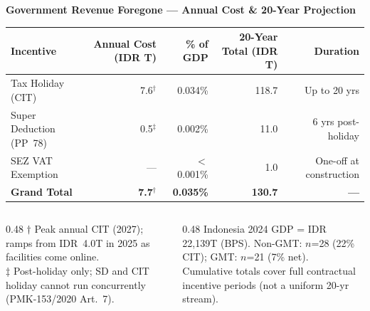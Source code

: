 \documentclass[aspectratio=169,10pt]{beamer}
\begin{document}
\begin{frame}{\textbf{Government Revenue Foregone — Annual Cost \& 20-Year Projection}}
\vspace{0.25cm}
\centering

{\small
\begin{tabular}{lrrrr}
\toprule
\rowcolor{navyblue}
\color{white}\textbf{Incentive} &
\color{white}\textbf{Annual Cost (IDR T)} &
\color{white}\textbf{\% of GDP} &
\color{white}\textbf{20-Year Total (IDR T)} &
\color{white}\textbf{Duration} \\
\midrule
\rowcolor{lightgray}
Tax Holiday (CIT)          & 7.6$^{\dagger}$ & 0.034\% & 118.7 & Up to 20 yrs \\
Super Deduction (PP~78)    & 0.5$^{\ddagger}$ & 0.002\% &  11.0 & 6 yrs post-holiday \\
\rowcolor{lightgray}
SEZ VAT Exemption          & --- & $<$0.001\% &   1.0 & One-off at construction \\
\midrule
\rowcolor{navyblue}
\color{white}\textbf{Grand Total} &
\color{white}\textbf{7.7$^{\dagger}$} &
\color{white}\textbf{0.035\%} &
\color{white}\textbf{130.7} &
\color{white}\textbf{---} \\
\bottomrule
\end{tabular}
}

\vspace{0.4cm}
\begin{columns}[T]
  \begin{column}{0.48\textwidth}
    {\scriptsize
      $\dagger$ Peak annual CIT (2027); ramps from IDR~4.0T in 2025 as facilities come online.\\
      $\ddagger$ Post-holiday only; SD and CIT holiday cannot run concurrently (PMK-153/2020 Art.~7).
    }
  \end{column}
  \begin{column}{0.48\textwidth}
    {\scriptsize
      Indonesia 2024 GDP = IDR 22,139T (BPS). Non-GMT: $n$=28 (22\% CIT); GMT: $n$=21 (7\% net).\\
      Cumulative totals cover full contractual incentive periods (not a uniform 20-yr stream).
    }
  \end{column}
\end{columns}
\end{frame}
\end{document}
